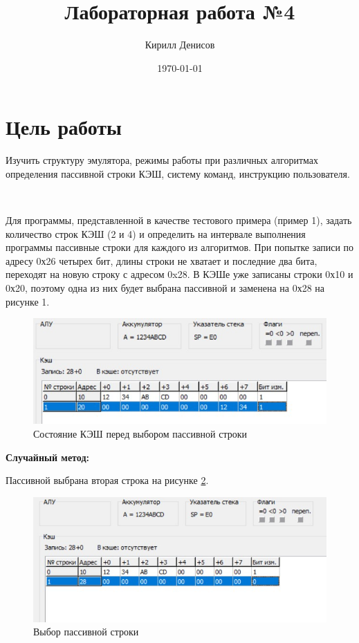 \documentclass[a4paper,14pt]{extarticle}
\author{Кирилл Денисов}
\title{Лабораторная работа №4}
\date{\today}
\newcommand{\pathToCommonFolder}{/home/denilai/Documents/repos/latex/Common}
\begin{document}
%	
\setcounter{page}{2}
	

	
\section*{Цель работы}
Изучить структуру эмулятора, режимы работы при различных алгоритмах
определения пассивной строки КЭШ, систему команд, инструкцию
пользователя.



\begin{problem*}{~}
	
Для программы, представленной в качестве тестового примера (пример 1),
задать количество строк КЭШ (2 и 4) и определить на интервале выполнения
программы пассивные строки для каждого из алгоритмов.
\nonum
При попытке записи по адресу 0х26 четырех бит, длины строки не хватает и
последние два бита, переходят на новую строку с адресом 0x28. В КЭШе уже
записаны строки 0х10 и 0х20, поэтому одна из них будет выбрана пассивной и
заменена на 0х28 на рисунке 1.
	\begin{figure}[h!]
		\centering
		\includegraphics[width=0.6\linewidth]{images/lab4-one}
		\caption{Состояние КЭШ перед выбором пассивной строки}
		\label{fig:lab4-one}
	\end{figure}

\textbf{Случайный метод:}

Пассивной выбрана вторая строка на рисунке \ref{fig:lab4-two}.

\begin{figure}[h!]
	\centering
	\includegraphics[width=0.6\linewidth]{images/lab4-two}
	\caption{Выбор пассивной строки}
	\label{fig:lab4-two}
\end{figure}


\end{problem*}
\end{document}
